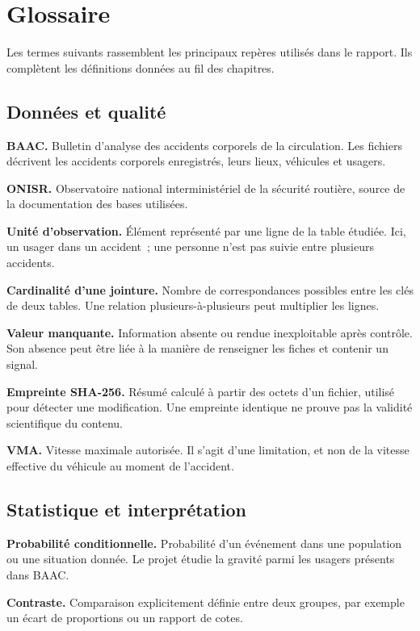 \chapter*{Glossaire}
{}

Les termes suivants rassemblent les principaux repères utilisés dans le rapport.
Ils complètent les définitions données au fil des chapitres.

\section*{Données et qualité}
\textbf{BAAC.} Bulletin d'analyse des accidents corporels de la circulation. Les
fichiers décrivent les accidents corporels enregistrés, leurs lieux, véhicules et usagers.

\textbf{ONISR.} Observatoire national interministériel de la sécurité routière,
source de la documentation des bases utilisées.

\textbf{Unité d'observation.} Élément représenté par une ligne de la table étudiée.
Ici, un usager dans un accident~; une personne n'est pas suivie entre plusieurs accidents.

\textbf{Cardinalité d'une jointure.} Nombre de correspondances possibles entre les
clés de deux tables. Une relation plusieurs-à-plusieurs peut multiplier les lignes.

\textbf{Valeur manquante.} Information absente ou rendue inexploitable après contrôle.
Son absence peut être liée à la manière de renseigner les fiches et contenir un signal.

\textbf{Empreinte SHA-256.} Résumé calculé à partir des octets d'un fichier, utilisé
pour détecter une modification. Une empreinte identique ne prouve pas la validité
scientifique du contenu.

\textbf{VMA.} Vitesse maximale autorisée. Il s'agit d'une limitation, et non de la
vitesse effective du véhicule au moment de l'accident.

\section*{Statistique et interprétation}
\textbf{Probabilité conditionnelle.} Probabilité d'un événement dans une population
ou une situation donnée. Le projet étudie la gravité parmi les usagers présents dans BAAC.

\textbf{Contraste.} Comparaison explicitement définie entre deux groupes, par exemple
un écart de proportions ou un rapport de cotes.

